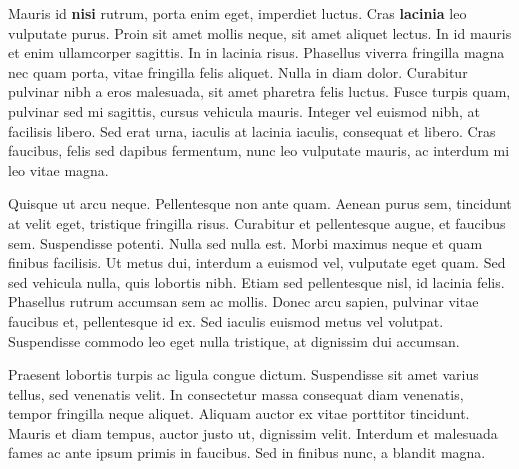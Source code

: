 \documentclass[12pt,a4paper]{article}
\begin{document}
{\color{emph} Mauris id\textbf{ nisi }rutrum, porta enim eget,  {\color{extra-emph} imperdiet luctus. Cras \textbf{lacinia} leo} vulputate purus. Proin sit amet mollis neque, sit} amet aliquet lectus. In id mauris et enim ullamcorper sagittis. In in lacinia risus. Phasellus viverra fringilla magna  nec quam porta, vitae fringilla felis aliquet. Nulla in diam dolor. Curabitur pulvinar nibh a eros malesuada, sit amet pharetra felis luctus. Fusce turpis quam, pulvinar sed mi sagittis, cursus vehicula mauris. Integer vel euismod nibh, at facilisis libero. Sed erat urna, iaculis at lacinia iaculis, consequat et libero. Cras faucibus, felis sed dapibus fermentum, nunc leo vulputate mauris, ac interdum mi leo vitae magna.

Quisque ut arcu neque. Pellentesque non ante quam. Aenean purus sem, tincidunt at velit eget, tristique fringilla risus. Curabitur et pellentesque augue, et faucibus sem. Suspendisse potenti. Nulla sed nulla est. Morbi maximus neque et quam finibus facilisis. Ut metus dui, interdum a euismod vel, vulputate eget quam. Sed sed vehicula nulla, quis lobortis nibh. Etiam sed pellentesque nisl, id lacinia felis. Phasellus rutrum accumsan sem ac mollis. Donec arcu sapien, pulvinar vitae faucibus et, pellentesque id ex. Sed iaculis euismod metus vel volutpat. Suspendisse commodo leo eget nulla tristique, at dignissim dui accumsan.

Praesent lobortis turpis ac ligula congue dictum. Suspendisse sit amet varius tellus, sed venenatis velit. In consectetur massa consequat diam venenatis, tempor fringilla neque aliquet. Aliquam auctor ex vitae porttitor tincidunt. Mauris et diam tempus, auctor justo ut, dignissim velit. Interdum et malesuada fames ac ante ipsum primis in faucibus. Sed in finibus nunc, a blandit magna. 
\end{document}
